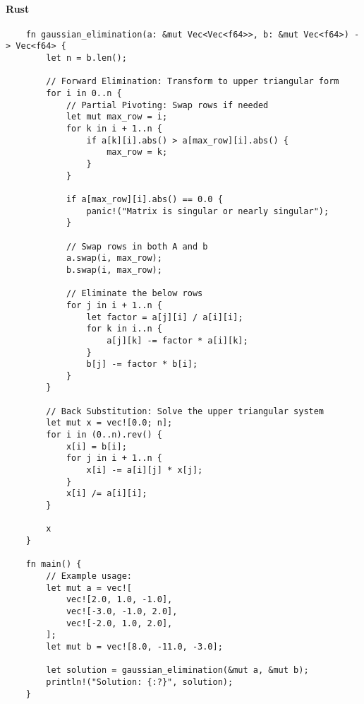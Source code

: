 \documentclass{article}
\begin{document}
            \paragraph{Rust}
                \begin{verbatim}
    fn gaussian_elimination(a: &mut Vec<Vec<f64>>, b: &mut Vec<f64>) -> Vec<f64> {
        let n = b.len();

        // Forward Elimination: Transform to upper triangular form
        for i in 0..n {
            // Partial Pivoting: Swap rows if needed
            let mut max_row = i;
            for k in i + 1..n {
                if a[k][i].abs() > a[max_row][i].abs() {
                    max_row = k;
                }
            }

            if a[max_row][i].abs() == 0.0 {
                panic!("Matrix is singular or nearly singular");
            }

            // Swap rows in both A and b
            a.swap(i, max_row);
            b.swap(i, max_row);

            // Eliminate the below rows
            for j in i + 1..n {
                let factor = a[j][i] / a[i][i];
                for k in i..n {
                    a[j][k] -= factor * a[i][k];
                }
                b[j] -= factor * b[i];
            }
        }

        // Back Substitution: Solve the upper triangular system
        let mut x = vec![0.0; n];
        for i in (0..n).rev() {
            x[i] = b[i];
            for j in i + 1..n {
                x[i] -= a[i][j] * x[j];
            }
            x[i] /= a[i][i];
        }

        x
    }

    fn main() {
        // Example usage:
        let mut a = vec![
            vec![2.0, 1.0, -1.0],
            vec![-3.0, -1.0, 2.0],
            vec![-2.0, 1.0, 2.0],
        ];
        let mut b = vec![8.0, -11.0, -3.0];

        let solution = gaussian_elimination(&mut a, &mut b);
        println!("Solution: {:?}", solution);
    }
                \end{verbatim}
\end{document}
